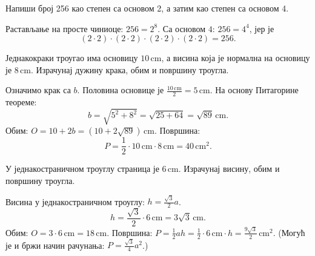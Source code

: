 \documentclass[11pt,a5paper,twoside,addpoints,noanswers]{exam} %
\newcommand{\measure}[2]{#1\,\mathrm{#2}}
\newcommand{\variant}[4]{#1}
\begin{document}
\begin{questions}
\question[3] %
 Напиши број \variant{256}{15625}{729}{512}
 као степен са основом \variant{2}{5}{3}{2},
 а затим као степен са основом \variant{4}{25}{9}{8}.

\begin{solution}[\stretch 2]
Растављање на просте чиниоце:
$\variant{256 = 2^8}{15625 = 5^6}{729 = 3^6}{512 = 2^9}$.
Са основом $\variant{4}{25}{9}{8}$:
$\variant{256 = 4^4}{15625 = 25^3}{729 = 9^3}{512 = 8^3}$, јер је
$$
	\variant{
		(2 \cdot 2) \cdot (2 \cdot 2) \cdot
		(2 \cdot 2) \cdot (2 \cdot 2) = 256
	}{
		(5 \cdot 5) \cdot
		(5 \cdot 5) \cdot
		(5 \cdot 5) = 15625
	}{
		(3 \cdot 3) \cdot
		(3 \cdot 3) \cdot
		(3 \cdot 3) = 729
	}{
		(2 \cdot 2 \cdot 2) \cdot
		(2 \cdot 2 \cdot 2) \cdot
		(2 \cdot 2 \cdot 2) = 512
	}.
$$
\end{solution}


\question[4] %
Једнакокраки троугао има основицу
$\measure{\variant{10}{12}{14}{8}}{cm}$,
а висина која је нормална на основицу је
$\measure{\variant{8}{9}{10}{6}}{cm}$.
Израчунај дужину крака, обим и површину троугла.

\begin{solution}[\stretch 3]
Означимо крак са $b$. Половина основице је $
	\frac{\measure{\variant{10}{12}{14}{8}}{cm}}2
	=\measure{\variant{5}{6}{7}{4}}{cm}
$. На основу Питагорине теореме:
\[
	b = \sqrt{
		\variant{5}{6}{7}{4}^2 + \variant{8}{9}{10}{6}^2
	}
	= \sqrt{\variant{25+64}{36+81}{49+100}{16+36}}
	= \measure{
		\variant{\sqrt{89}}{\sqrt{117}}{\sqrt{149}}{\sqrt{52}}
	}{cm}.
\]
Обим:
$
	O = \variant{10}{12}{14}{8} + 2b
	= \measure{(
		\variant{10}{12}{14}{8} +
		\variant{2 \sqrt{89}}{2 \sqrt{117}}{2 \sqrt{149}}{4 \sqrt{13}}
	)}{cm}
$.
Површина:
$$
	P = \frac{1}{2}\cdot
	\measure{\variant{10}{12}{14}{8}}{cm} \cdot
	\measure{\variant{8}{9}{10}{6}}{cm}
	= \measure{\variant{40}{54}{70}{24}}{cm^2}.
$$
\end{solution}
\ifprintanswers\else\newpage\fi

\question[4] %
У једнакостраничном троуглу страница је $\measure{\variant{6}{9}{12}{8}}{cm}$. Израчунај висину, обим и површину троугла.

\begin{solution}[\stretch 3]
Висина у једнакостраничном троуглу: $h = \frac{\sqrt{3}}{2} a$.
\[
h = \frac{\sqrt{3}}{2}\cdot \measure{\variant{6}{9}{12}{8}}{cm}
= \measure{\variant{3\sqrt{3}}{\tfrac{9\sqrt{3}}{2}}{6\sqrt{3}}{4\sqrt{3}}}{cm}.
\]
Обим: $O = 3\cdot \measure{\variant{6}{9}{12}{8}}{cm} = \measure{\variant{18}{27}{36}{24}}{cm}$.
Површина: $P = \frac{1}{2} a h = \frac{1}{2}\cdot \measure{\variant{6}{9}{12}{8}}{cm} \cdot h
= \measure{\variant{\tfrac{9\sqrt{3}}{2}}{\tfrac{81\sqrt{3}}{4}}{36\sqrt{3}}{16\sqrt{3}}}{cm^2}$.
(Могућ је и бржи начин рачунања: $P=\frac{\sqrt3}{4}a^2$.)
\end{solution}


\end{questions}
\end{document}
